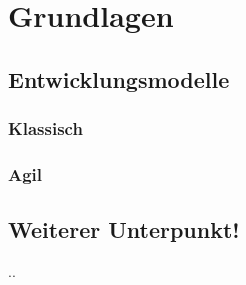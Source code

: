\chapter{Grundlagen}

\section{Entwicklungsmodelle}

\subsection{Klassisch}

\subsection{Agil}

\section{Weiterer Unterpunkt!}

..

